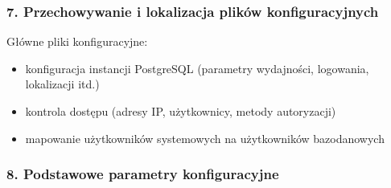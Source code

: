 \documentclass[letterpaper,10pt,polish]{sphinxmanual}
\begin{document}
\subsubsection{7. Przechowywanie i lokalizacja plików konfiguracyjnych}
\label{\detokenize{rozdzial2/Konfiguracja_baz_danych/Konfiguracja_baz_danych:przechowywanie-i-lokalizacja-plikow-konfiguracyjnych}}
\sphinxAtStartPar
Główne pliki konfiguracyjne:
\begin{itemize}
\item {} 
\sphinxAtStartPar
{} \textendash{} konfiguracja instancji PostgreSQL (parametry wydajności, logowania, lokalizacji itd.)

\item {} 
\sphinxAtStartPar
{} \textendash{} kontrola dostępu (adresy IP, użytkownicy, metody autoryzacji)

\item {} 
\sphinxAtStartPar
{} \textendash{} mapowanie użytkowników systemowych na użytkowników bazodanowych

\end{itemize}


\subsubsection{8. Podstawowe parametry konfiguracyjne}
\label{\detokenize{rozdzial2/Konfiguracja_baz_danych/Konfiguracja_baz_danych:podstawowe-parametry-konfiguracyjne}}
\sphinxAtStartPar
{}

\begin{sphinxVerbatim}[commandchars=\\\{\}]
  
  
\end{sphinxVerbatim}

\sphinxAtStartPar
{}

\begin{sphinxVerbatim}[commandchars=\\\{\}]
           
                   
      
\end{sphinxVerbatim}
\end{document}
